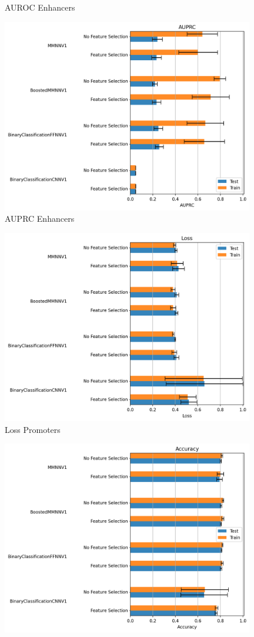 \documentclass{article}
\begin{document}
\begin{enumerate}
\begin{figure}[!ht]
        \caption{AUROC Enhancers}
        \label{fig:AUROC_enhancers}
    \end{figure}
    \begin{figure}[!ht]
        \centering
        \includegraphics[width=11cm]{image/barplots/enhancers/AUPRC_enhancers.PNG}
        \caption{AUPRC Enhancers}
        \label{fig:AUPRC_enhancers}
    \end{figure}
    \begin{figure}[!ht]
        \centering
        \includegraphics[width=11cm]{image/barplots/promoters/Loss_promoters.PNG}
        \caption{Loss Promoters}
        \label{fig:Loss_promoters}
    \end{figure}
    \begin{figure}[!ht]
        \centering
        \includegraphics[width=11cm]{image/barplots/promoters/Accuracy_promoters.PNG}

\end{figure}
\end{enumerate}
\end{document}
